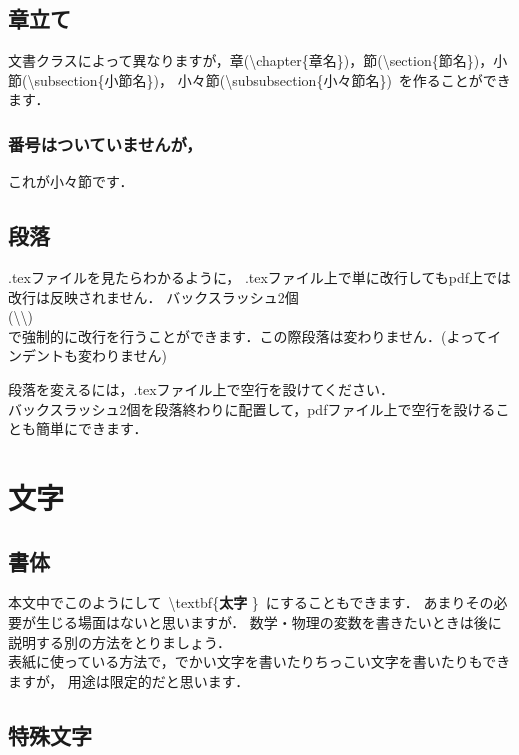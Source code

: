 \documentclass[11pt,a4j,onecolumn]{jsreport} %
\begin{document}
\subsection{章立て}

文書クラスによって異なりますが，章(\textbackslash chapter\{章名\})，節(\textbackslash section\{節名\})，小節(\textbackslash subsection\{小節名\})，
小々節(\textbackslash subsubsection\{小々節名\})~を作ることができます．
\subsubsection{番号はついていませんが，}
これが小々節です．

\subsection{段落}

.texファイルを見たらわかるように，
.texファイル上で単に改行してもpdf上では改行は反映されません．
バックスラッシュ2個\\ (\textbackslash\textbackslash) \\
で強制的に改行を行うことができます．この際段落は変わりません．(よってインデントも変わりません)

段落を変えるには，.texファイル上で空行を設けてください．\\

バックスラッシュ2個を段落終わりに配置して，pdfファイル上で空行を設けることも簡単にできます．

\section{文字}

\subsection{書体}

本文中でこのようにして~\textbackslash textbf\{\textbf{太字} \}~にすることもできます．
あまりその必要が生じる場面はないと思いますが．
数学・物理の変数を書きたいときは後に説明する別の方法をとりましょう．\\

表紙に使っている方法で，{\Huge でかい文字を書いたり}{\tiny ちっこい文字を書いたり}もできますが，
用途は限定的だと思います．

\subsection{特殊文字}
\end{document}
